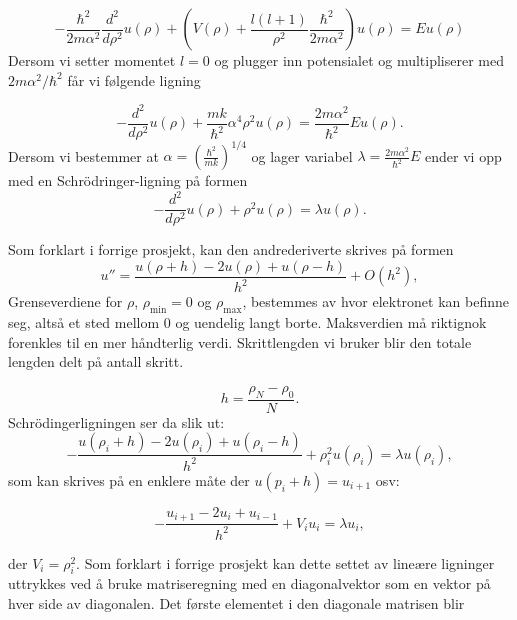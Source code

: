 \documentclass[12pt]{article}
\begin{document}
\begin{equation*}
  -\frac{\hbar^2}{2 m \alpha^2} \frac{d^2}{d\rho^2} u(\rho)+ \left ( V(\rho) + \frac{l (l + 1)}{\rho^2}\frac{\hbar^2}{2 m\alpha^2} \right ) u(\rho)  = E u(\rho)
\end{equation*}
Dersom vi setter momentet $l=0$ og plugger inn potensialet og multipliserer
med $2m\alpha^2/\hbar^2$ får vi følgende ligning

\begin{equation*}
  -\frac{d^2}{d\rho^2} u(\rho) 
       + \frac{mk}{\hbar^2} \alpha^4\rho^2u(\rho)  = \frac{2m\alpha^2}{\hbar^2}E u(\rho) .
\end{equation*}
Dersom vi bestemmer at $\alpha  = \left(\frac{\hbar^2}{mk}\right)^{1/4}$ og
lager variabel $\lambda = \frac{2m\alpha^2}{\hbar^2}E$ ender vi opp med en
Schrödringer-ligning på formen
\begin{equation*}
  -\frac{d^2}{d\rho^2} u(\rho) + \rho^2u(\rho)  = \lambda u(\rho) .
\end{equation*}

Som forklart i forrige prosjekt, kan den andrederiverte skrives på formen
\begin{equation}
    u''=\frac{u(\rho+h) -2u(\rho) +u(\rho-h)}{h^2} +O(h^2),
    \label{eq:diffoperation}
\end{equation}
Grenseverdiene for $\rho$, $\rho_{\mathrm{min}}=0$ og
$\rho_{\mathrm{max}}$, bestemmes av hvor elektronet kan befinne seg, altså
et sted mellom 0 og uendelig langt borte. Maksverdien må riktignok
forenkles til en mer håndterlig verdi. Skrittlengden vi bruker blir den
totale lengden delt på antall skritt.

\begin{equation*}
  h=\frac{\rho_N-\rho_0 }{N}.
\end{equation*}
Schrödingerligningen ser da slik ut:
\begin{equation}
-\frac{u(\rho_i+h) -2u(\rho_i) +u(\rho_i-h)}{h^2}+\rho_i^2u(\rho_i)  = \lambda u(\rho_i),
\end{equation}
som kan skrives på en enklere måte der $u(p_i+h)=u_{i+1}$ osv:

\begin{equation}
-\frac{u_{i+1} -2u_i +u_{i-1} }{h^2}+V_iu_i  = \lambda u_i,
\end{equation}

der $V_i=\rho_i^2$. Som forklart i forrige prosjekt kan dette settet av
lineære ligninger uttrykkes ved å bruke matriseregning med en
diagonalvektor som en vektor på hver side av diagonalen. Det første
elementet i den diagonale matrisen blir
\end{document}
